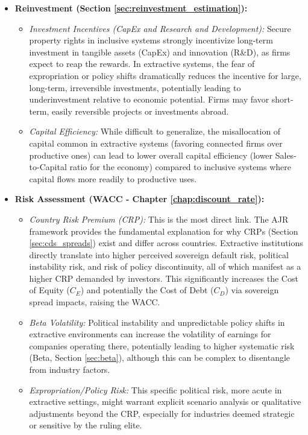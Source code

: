\begin{itemize}
    \item \textbf{Reinvestment (Section \ref{sec:reinvestment_estimation}):}
          \begin{itemize}
              \item \textit{Investment Incentives (CapEx and Research and Development):} Secure property rights in inclusive systems strongly incentivize long-term investment in tangible assets (CapEx) and innovation (R\&D), as firms expect to reap the rewards. In extractive systems, the fear of expropriation or policy shifts dramatically reduces the incentive for large, long-term, irreversible investments, potentially leading to underinvestment relative to economic potential. Firms may favor short-term, easily reversible projects or investments abroad.
              \item \textit{Capital Efficiency:} While difficult to generalize, the misallocation of capital common in extractive systems (favoring connected firms over productive ones) can lead to lower overall capital efficiency (lower Sales-to-Capital ratio for the economy) compared to inclusive systems where capital flows more readily to productive uses.
          \end{itemize}

    \item \textbf{Risk Assessment (WACC - Chapter \ref{chap:discount_rate}):}
          \begin{itemize}
              \item \textit{Country Risk Premium (CRP):} This is the most direct link. The AJR framework provides the fundamental explanation for why CRPs (Section \ref{sec:cds_spreads}) exist and differ across countries. Extractive institutions directly translate into higher perceived sovereign default risk, political instability risk, and risk of policy discontinuity, all of which manifest as a higher CRP demanded by investors. This significantly increases the Cost of Equity (\(C_E\)) and potentially the Cost of Debt (\(C_D\)) via sovereign spread impacts, raising the WACC.
              \item \textit{Beta Volatility:} Political instability and unpredictable policy shifts in extractive environments can increase the volatility of earnings for companies operating there, potentially leading to higher systematic risk (Beta, Section \ref{sec:beta}), although this can be complex to disentangle from industry factors.
              \item \textit{Expropriation/Policy Risk:} This specific political risk, more acute in extractive settings, might warrant explicit scenario analysis or qualitative adjustments beyond the CRP, especially for industries deemed strategic or sensitive by the ruling elite.
          \end{itemize}


\end{itemize}
